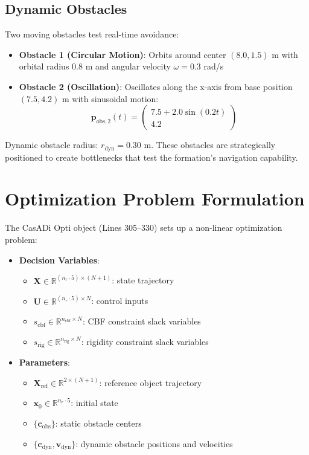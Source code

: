\documentclass[12pt,a4paper]{article}
\begin{document}
\subsection{Dynamic Obstacles}
Two moving obstacles test real-time avoidance:

\begin{itemize}
    \item \textbf{Obstacle 1 (Circular Motion)}: Orbits around center $(8.0, 1.5)$ m with orbital radius 0.8 m and angular velocity $\omega = 0.3$ rad/s
    
    \item \textbf{Obstacle 2 (Oscillation)}: Oscillates along the x-axis from base position $(7.5, 4.2)$ m with sinusoidal motion:
    \[
    \mathbf{p}_{\text{obs},2}(t) = \begin{pmatrix} 7.5 + 2.0\sin(0.2t) \\ 4.2 \end{pmatrix}
    \]
\end{itemize}

Dynamic obstacle radius: $r_{\text{dyn}} = 0.30$ m. These obstacles are strategically positioned to create bottlenecks that test the formation's navigation capability.

\section{Optimization Problem Formulation}

The CasADi Opti object (Lines 305--330) sets up a non-linear optimization problem:

\begin{itemize}
    \item \textbf{Decision Variables}:
    \begin{itemize}
        \item $\mathbf{X} \in \mathbb{R}^{(n_r \cdot 5) \times (N+1)}$: state trajectory
        \item $\mathbf{U} \in \mathbb{R}^{(n_r \cdot 5) \times N}$: control inputs
        \item $s_{\text{cbf}} \in \mathbb{R}^{n_{\text{cbf}} \times N}$: CBF constraint slack variables
        \item $s_{\text{rig}} \in \mathbb{R}^{n_{\text{rig}} \times N}$: rigidity constraint slack variables
    \end{itemize}
    
    \item \textbf{Parameters}:
    \begin{itemize}
        \item $\mathbf{X}_{\text{ref}} \in \mathbb{R}^{2 \times (N+1)}$: reference object trajectory
        \item $\mathbf{x}_0 \in \mathbb{R}^{n_r \cdot 5}$: initial state
        \item $\{\mathbf{c}_{\text{obs}}\}$: static obstacle centers
        \item $\{\mathbf{c}_{\text{dyn}}, \mathbf{v}_{\text{dyn}}\}$: dynamic obstacle positions and velocities
    \end{itemize}
\end{itemize}
\end{document}
